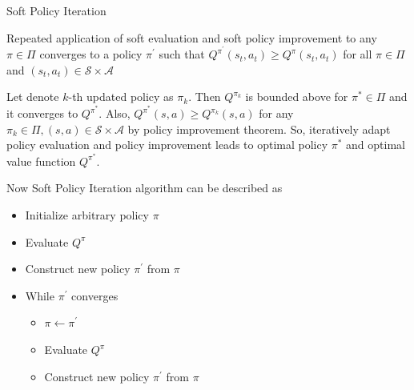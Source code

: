 \documentclass[8pt]{beamer}
\begin{document}
\begin{frame}{Soft Policy Iteration}
    \begin{theorem}
        Repeated application of soft evaluation and soft policy improvement to any $\pi \in \Pi$ converges to a policy $\pi^\prime$ such that $Q^{\pi^\prime} (s_t, a_t) \geq Q^\pi (s_t, a_t)$ for all $\pi \in \Pi$ and $(s_t, a_t) \in \mathcal{S}\times\mathcal{A}$
    \end{theorem}
    Let denote $k$-th updated policy as $\pi_k$. Then $Q^{\pi_k}$ is bounded above for $\pi^\ast \in \Pi$ and it converges to $Q^{\pi^\ast}$. Also, $Q^{\pi^\ast} (s,a) \geq Q^{\pi_k} (s,a)$ for any $\pi_k \in \Pi, (s,a) \in \mathcal{S} \times \mathcal{A}$ by policy improvement theorem. So, iteratively adapt policy evaluation and policy improvement leads to optimal policy $\pi^\ast$ and optimal value function $Q^{\pi^\ast}$.
    \bigskip

    Now Soft Policy Iteration algorithm can be described as
    \begin{itemize}
        \item Initialize arbitrary policy $\pi$
        \item Evaluate $Q^\pi$
        \item Construct new policy $\pi^\prime$ from $\pi$
        \item While $\pi^\prime$ converges
        \begin{itemize}
            \item $\pi \leftarrow \pi^\prime$
            \item Evaluate $Q^\pi$
            \item Construct new policy $\pi^\prime$ from $\pi$
        \end{itemize}
    \end{itemize}
\end{frame}
\end{document}
